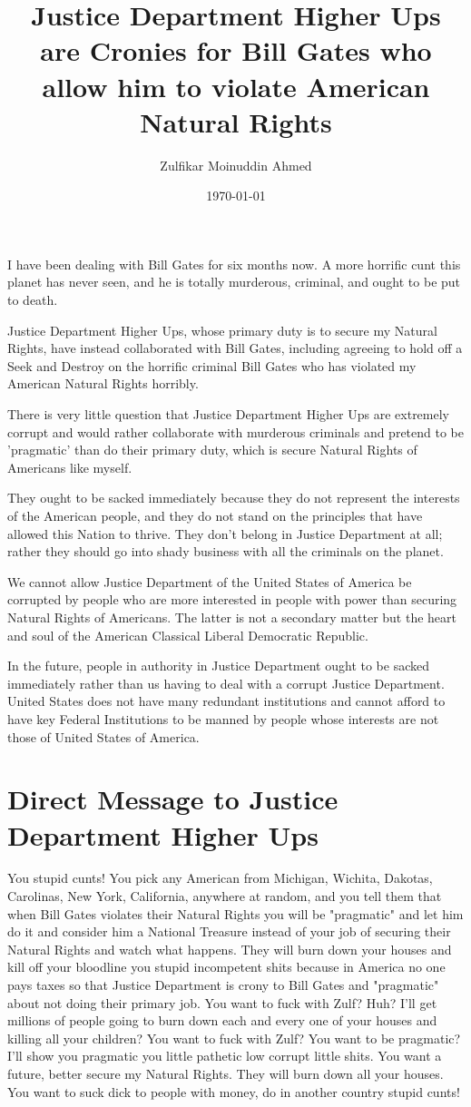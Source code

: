 \documentclass{amsart}
\title{Justice Department Higher Ups are Cronies for Bill Gates who allow him to violate American Natural Rights}
\author{Zulfikar Moinuddin Ahmed}
\date{\today}
\begin{document}
\maketitle

I have been dealing with Bill Gates for six months now.  A more horrific cunt this planet has never seen, and he is totally murderous, criminal, and ought to be put to death. 

Justice Department Higher Ups, whose primary duty is to secure my Natural Rights, have instead collaborated with Bill Gates, including agreeing to hold off a Seek and Destroy on the horrific criminal Bill Gates who has violated my American Natural Rights horribly.  

There is very little question that Justice Department Higher Ups are extremely corrupt and would rather collaborate with murderous criminals and pretend to be 'pragmatic' than do their primary duty, which is secure Natural Rights of Americans like myself.  

They ought to be sacked immediately because they do not represent the interests of the American people, and they do not stand on the principles that have allowed this Nation to thrive.  They don't belong in Justice Department at all; rather they should go into shady business with all the criminals on the planet. 

We cannot allow Justice Department of the United States of America be corrupted by people who are more interested in people with power than securing Natural Rights of Americans.  The latter is not a secondary matter but the heart and soul of the American Classical Liberal Democratic Republic. 

In the future, people in authority in Justice Department ought to be sacked immediately rather than us having to deal with a corrupt Justice Department.  United States does not have many redundant institutions and cannot afford to have key Federal Institutions to be manned by people whose interests are not those of United States of America.


\section{Direct Message to Justice Department Higher Ups}

You stupid cunts!  You pick any American from Michigan, Wichita, Dakotas, Carolinas, New York, California, anywhere at random, and you tell them that when Bill Gates violates their Natural Rights you will be "pragmatic" and let him do it and consider him a National Treasure instead of your job of securing their Natural Rights and watch what happens.   They will burn down your houses and kill off your bloodline you stupid incompetent shits because in America no one pays taxes so that Justice Department is crony to Bill Gates and "pragmatic" about not doing their primary job.  You want to fuck with Zulf?  Huh?  I'll get millions of people going to burn down each and every one of your houses and killing all your children?  You want to fuck with Zulf?  You want to be pragmatic?  I'll show you pragmatic you little pathetic low corrupt little shits.  You want a future, better secure my Natural Rights.  They will burn down all your houses.  You want to suck dick to people with money, do in another country stupid cunts!
\end{document}
